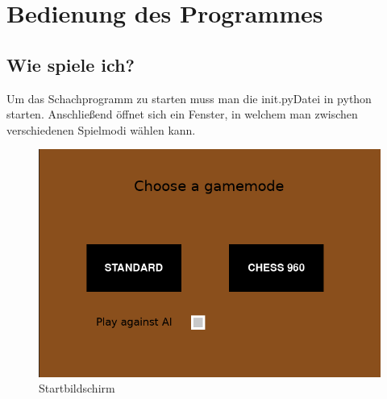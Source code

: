 \documentclass[a4paper, 10pt]{scrartcl}
\begin{document}
\section{Bedienung des Programmes}
\subsection{Wie spiele ich?}
Um das Schachprogramm zu starten muss man die \glqq init.py\grqq  Datei in python starten. Anschließend öffnet sich ein Fenster, in welchem man zwischen verschiedenen Spielmodi
wählen kann.

\begin{figure}[h]
        \centering
        \includegraphics[scale=0.5]{assets/start_screen.PNG}
        \caption{Startbildschirm}
\end{figure}
\end{document}
